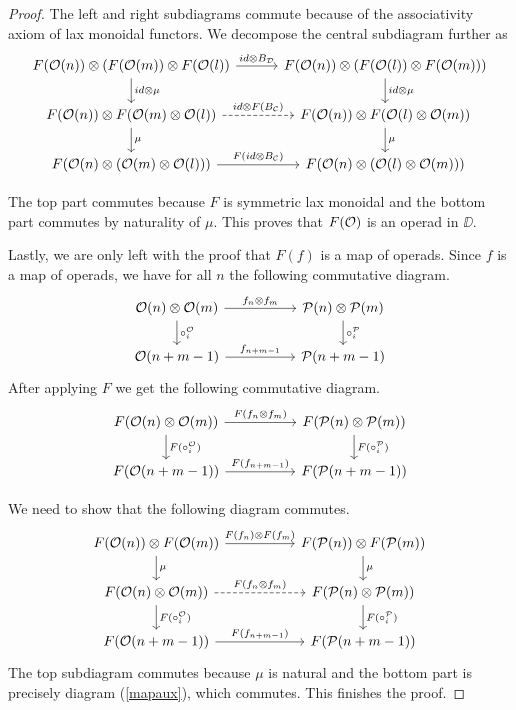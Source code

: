 \documentclass[Thesis.tex]{subfiles}
\begin{document}
\begin{proof}
   
   The left and right subdiagrams commute because of the associativity axiom of lax monoidal functors. We decompose the central subdiagram further as
   \[
\begin{tikzcd}[column sep = 3em]
F(\OO(n))\otimes (F(\OO(m))\otimes F(\OO(l))\arrow[r, "id\otimes B_\DD"]\arrow[d, "id\otimes \mu"] & F(\OO(n))\otimes (F(\OO(l))\otimes F(\OO(m)))\arrow[d, "id\otimes \mu"]\\
F(\OO(n))\otimes F(\OO(m)\otimes\OO(l))\arrow[r, dashed,  "id\otimes F(B_\CC)"]\arrow[d, "\mu"] & F(\OO(n))\otimes F(\OO(l)\otimes\OO(m))\arrow[d, "\mu"]\\
F(\OO(n)\otimes (\OO(m)\otimes\OO(l)))\arrow[r, "F(id\otimes B_\CC)"] & F(\OO(n)\otimes (\OO(l)\otimes \OO(m)))
\end{tikzcd}   
   \]
   
   
   The top part commutes because $F$ is symmetric lax monoidal and the bottom part commutes by naturality of $\mu$. This proves that $F({\mathcal O})$ is an operad in $\DD$. 
   
   Lastly, we are only left with the proof that $F(f)$ is a map of operads. Since $f$ is a map of operads, we have for all $n$ the following commutative diagram.
   \[
\begin{tikzcd}[column sep = 5em]
\OO(n)\otimes \OO(m)\arrow[r, "f_n\otimes f_m"]\arrow[d, "\circ_i^\OO"] & \PP(n)\otimes\PP(m)\arrow[d, "\circ_i^\PP"]\\
\OO(n+m-1)\arrow[r, "f_{n+m-1}"] & \PP(n+m-1)
\end{tikzcd}   
   \]
   After applying $F$ we get the following commutative diagram.
   \begin{equation}\label{mapaux}
   \begin{tikzcd}[column sep = 5em]
F(\OO(n)\otimes \OO(m))\arrow[r, "F(f_n\otimes f_m)"]\arrow[d, "F(\circ_i^\OO)"] & F(\PP(n)\otimes\PP(m))\arrow[d, "F(\circ_i^\PP)"]\\
F(\OO(n+m-1))\arrow[r, "F(f_{n+m-1})"] & F(\PP(n+m-1))
\end{tikzcd} 
   \end{equation}
   
   We need to show that the following diagram commutes.
   \[
   \begin{tikzcd}[column sep = 5em]
F(\OO(n))\otimes F(\OO(m))\arrow[r, "F(f_n)\otimes F(f_m)"]\arrow[d,"\mu"] & F(\PP(n))\otimes F(\PP(m))\arrow[d, "\mu"]\\
F(\OO(n)\otimes \OO(m))\arrow[r, dashed, "F(f_n\otimes f_m)"]\arrow[d, "F(\circ_i^\OO)"] & F(\PP(n)\otimes\PP(m))\arrow[d, "F(\circ_i^\PP)"]\\
F(\OO(n+m-1))\arrow[r, "F(f_{n+m-1})"] & F(\PP(n+m-1))
\end{tikzcd}    
   \]
   The top subdiagram commutes because $\mu$ is natural and the bottom part is precisely diagram  (\ref{mapaux}), which commutes. This finishes the proof.
\end{proof}
\end{document}
